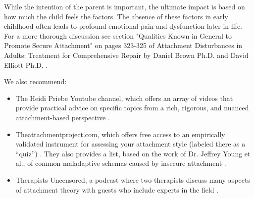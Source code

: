 \documentclass[12pt,letterpaper]{article}
\begin{document}
While the intention of the parent is important, the ultimate impact is based on how much the child feels the factors. The absence of these factors in early childhood often leads to profound emotional pain and dysfunction later in life. For a more thorough discussion see section "Qualities Known in General to Promote Secure Attachment" on pages 323-325 of Attachment Disturbances in Adults: Treatment for Comprehensive Repair by Daniel Brown Ph.D. and David Elliott Ph.D. \cite{brownAttachmentDisturbances}.  

We also recommend:
\begin{itemize}
    \item The Heidi Priebe Youtube channel, which offers an array of videos that provide practical advice on specific topics from a rich, rigorous, and nuanced attachment-based perspective \cite{priebeYoutube}.
    \item Theattachmentproject.com, which offers free access to an empirically validated instrument for assessing your attachment style (labeled there as a “quiz”) \cite{attachmentProject}. They also provides a list, based on the work of Dr. Jeffrey Young et al., of common maladaptive schemas caused by insecure attachment \cite{earlyMalSchemas}.
    \item Therapists Uncensored, a podcast where two therapists discuss many aspects of attachment theory with guests who include experts in the field \cite{therapistsUncensored}.
\end{itemize}
\end{document}
